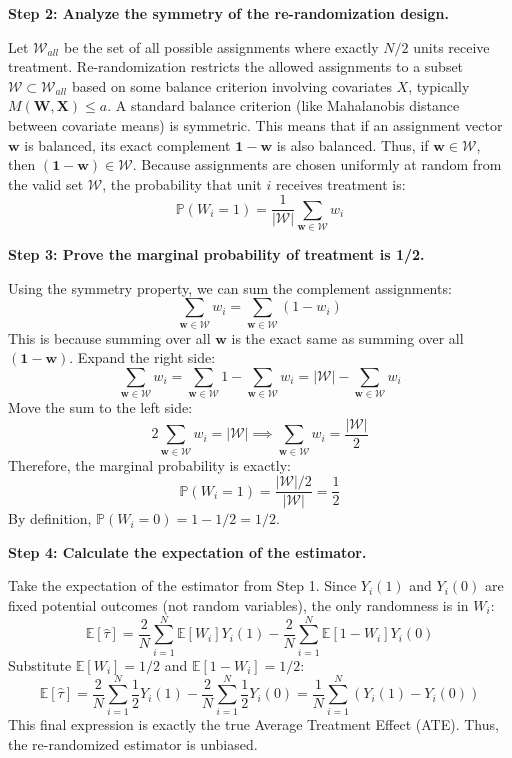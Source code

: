 \begin{solution}
\textbf{Step 2: Analyze the symmetry of the re-randomization design.}

Let $\mathcal{W}_{all}$ be the set of all possible assignments where exactly $N/2$ units receive treatment.
Re-randomization restricts the allowed assignments to a subset $\mathcal{W} \subset \mathcal{W}_{all}$ based on some balance criterion involving covariates $X$, typically $M(\mathbf{W}, \mathbf{X}) \leq a$.
A standard balance criterion (like Mahalanobis distance between covariate means) is symmetric. This means that if an assignment vector $\mathbf{w}$ is balanced, its exact complement $\mathbf{1} - \mathbf{w}$ is also balanced. 
Thus, if $\mathbf{w} \in \mathcal{W}$, then $(\mathbf{1} - \mathbf{w}) \in \mathcal{W}$.
Because assignments are chosen uniformly at random from the valid set $\mathcal{W}$, the probability that unit $i$ receives treatment is:
\[ \mathbb{P}(W_i = 1) = \frac{1}{|\mathcal{W}|} \sum_{\mathbf{w} \in \mathcal{W}} w_i \]

\textbf{Step 3: Prove the marginal probability of treatment is 1/2.}

Using the symmetry property, we can sum the complement assignments:
\[ \sum_{\mathbf{w} \in \mathcal{W}} w_i = \sum_{\mathbf{w} \in \mathcal{W}} (1 - w_i) \]
This is because summing over all $\mathbf{w}$ is the exact same as summing over all $(\mathbf{1}-\mathbf{w})$.
Expand the right side:
\[ \sum_{\mathbf{w} \in \mathcal{W}} w_i = \sum_{\mathbf{w} \in \mathcal{W}} 1 - \sum_{\mathbf{w} \in \mathcal{W}} w_i = |\mathcal{W}| - \sum_{\mathbf{w} \in \mathcal{W}} w_i \]
Move the sum to the left side:
\[ 2 \sum_{\mathbf{w} \in \mathcal{W}} w_i = |\mathcal{W}| \implies \sum_{\mathbf{w} \in \mathcal{W}} w_i = \frac{|\mathcal{W}|}{2} \]
Therefore, the marginal probability is exactly:
\[ \mathbb{P}(W_i = 1) = \frac{|\mathcal{W}|/2}{|\mathcal{W}|} = \frac{1}{2} \]
By definition, $\mathbb{P}(W_i = 0) = 1 - 1/2 = 1/2$.

\textbf{Step 4: Calculate the expectation of the estimator.}

Take the expectation of the estimator from Step 1. Since $Y_i(1)$ and $Y_i(0)$ are fixed potential outcomes (not random variables), the only randomness is in $W_i$:
\[ \mathbb{E}[\hat{\tau}] = \frac{2}{N} \sum_{i=1}^N \mathbb{E}[W_i] Y_i(1) - \frac{2}{N} \sum_{i=1}^N \mathbb{E}[1-W_i] Y_i(0) \]
Substitute $\mathbb{E}[W_i] = 1/2$ and $\mathbb{E}[1-W_i] = 1/2$:
\[ \mathbb{E}[\hat{\tau}] = \frac{2}{N} \sum_{i=1}^N \frac{1}{2} Y_i(1) - \frac{2}{N} \sum_{i=1}^N \frac{1}{2} Y_i(0) = \frac{1}{N} \sum_{i=1}^N (Y_i(1) - Y_i(0)) \]
This final expression is exactly the true Average Treatment Effect (ATE). Thus, the re-randomized estimator is unbiased.
\end{solution}

